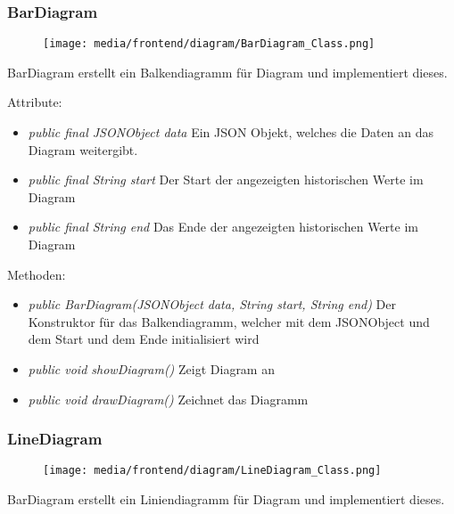\subsubsection{BarDiagram}
\begin{minipage}{0.3\textwidth}
    \begin{figure}[H]
        \texttt{[image: media/frontend/diagram/BarDiagram\_Class.png]}
    \end{figure}
    \end{minipage} \hfill
    \begin{minipage}{0.6\textwidth}
BarDiagram erstellt ein Balkendiagramm für Diagram und implementiert dieses.
\end{minipage}

Attribute:
\begin{itemize} 
    \item \emph{public final JSONObject data} Ein JSON Objekt, welches die Daten an das Diagram weitergibt.
    \item \emph{public final String start} Der Start der angezeigten historischen Werte im Diagram
    \item \emph{public final String end} Das Ende der angezeigten historischen Werte im Diagram
\end{itemize}   
Methoden:
\begin{itemize}      
    \item \emph{public BarDiagram(JSONObject data, String start, String end)} Der Konstruktor für das Balkendiagramm, welcher mit dem JSONObject und dem Start und dem Ende initialisiert wird
    \item \emph{public void showDiagram()} Zeigt Diagram an
    \item \emph{public void drawDiagram()} Zeichnet das Diagramm
\end{itemize}

\subsubsection{LineDiagram}
\begin{minipage}{0.3\textwidth}
    \begin{figure}[H]
        \texttt{[image: media/frontend/diagram/LineDiagram\_Class.png]}
    \end{figure}
    \end{minipage} \hfill
    \begin{minipage}{0.6\textwidth}
BarDiagram erstellt ein Liniendiagramm für Diagram und implementiert dieses.
\end{minipage}

